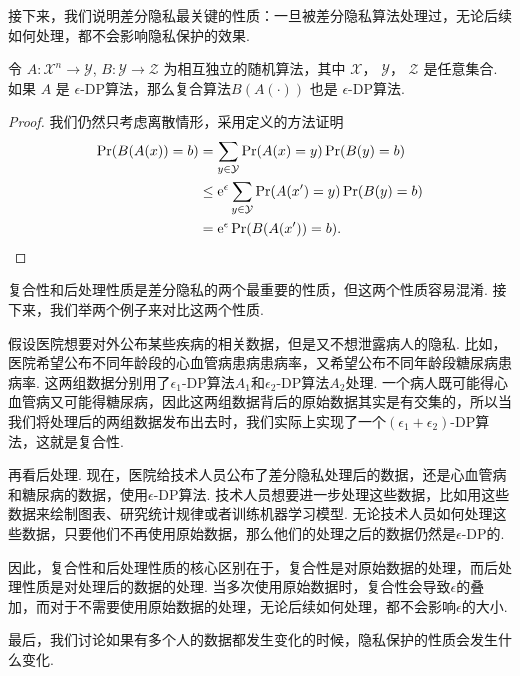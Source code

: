 接下来，我们说明差分隐私最关键的性质：一旦被差分隐私算法处理过，无论后续如何处理，都不会影响隐私保护的效果.

\begin{proposition}[后处理]\label{proposition:post-processing}
    令 $A : \mathcal X^n \to \mathcal Y$, $B : \mathcal Y \to \mathcal Z$ 为相互独立的随机算法，其中 $\mathcal X$， $\mathcal Y$， $\mathcal Z$ 是任意集合. 如果 $A$ 是 $\epsilon$-DP算法，那么复合算法$ B(A(\cdot))$ 也是 $\epsilon$-DP算法.
\end{proposition}
\begin{proof}
我们仍然只考虑离散情形，采用定义的方法证明
    \[
    \begin{aligned}
        \Pr(B(A(x)) = b) &= \sum_{y \in \mathcal Y} \Pr(A(x) = y) \Pr(B(y) = b) \\
        &\leq \mathrm{e}^{\epsilon} \sum_{y\in \mathcal Y}\Pr(A(x') = y)\Pr(B(y) = b)\\
        &= \mathrm{e}^{\epsilon}\Pr(B(A(x')) = b).
    \end{aligned}
    \]
\end{proof}

复合性和后处理性质是差分隐私的两个最重要的性质，但这两个性质容易混淆. 接下来，我们举两个例子来对比这两个性质. 

假设医院想要对外公布某些疾病的相关数据，但是又不想泄露病人的隐私. 比如，医院希望公布不同年龄段的心血管病患病患病率，又希望公布不同年龄段糖尿病患病率. 这两组数据分别用了$\epsilon_1$-DP算法$A_1$和$\epsilon_2$-DP算法$A_2$处理. 一个病人既可能得心血管病又可能得糖尿病，因此这两组数据背后的原始数据其实是有交集的，所以当我们将处理后的两组数据发布出去时，我们实际上实现了一个$(\epsilon_1+\epsilon_2)$-DP算法，这就是复合性.

再看后处理. 现在，医院给技术人员公布了差分隐私处理后的数据，还是心血管病和糖尿病的数据，使用$\epsilon$-DP算法. 技术人员想要进一步处理这些数据，比如用这些数据来绘制图表、研究统计规律或者训练机器学习模型. 无论技术人员如何处理这些数据，只要他们不再使用原始数据，那么他们的处理之后的数据仍然是$\epsilon$-DP的.

因此，复合性和后处理性质的核心区别在于，复合性是对原始数据的处理，而后处理性质是对处理后的数据的处理. 当多次使用原始数据时，复合性会导致$\epsilon$的叠加，而对于不需要使用原始数据的处理，无论后续如何处理，都不会影响$\epsilon$的大小.

最后，我们讨论如果有多个人的数据都发生变化的时候，隐私保护的性质会发生什么变化. 

